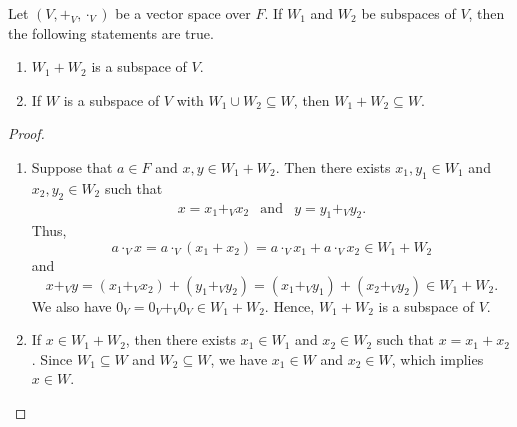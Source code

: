 \begin{theorem}\label{thm:sum}
  Let $(V, +_V, \cdot_V)$ be a vector space over $F$.
  If $W_1$ and $W_2$ be subspaces of $V$, then the following statements are
  true.
  \begin{enumerate}
    \item $W_1 + W_2$ is a subspace of $V$.
    \item If $W$ is a subspace of $V$ with $W_1 \cup W_2 \subseteq W$,
      then $W_1 + W_2 \subseteq W$.
  \end{enumerate}
\end{theorem}
\begin{proof} \leavevmode
  \begin{enumerate}
    \item Suppose that $a \in F$ and $x, y \in W_1 + W_2$.
      Then there exists $x_1, y_1 \in W_1$ and $x_2, y_2 \in W_2$ such that
      \begin{equation*}
        \begin{array}{lll}
        x = x_1 +_V x_2
          & \text{and}
          & y = y_1 +_V y_2.
        \end{array}
      \end{equation*}
      Thus,
      \begin{equation*}
        a \cdot_V x
          = a \cdot_V (x_1 + x_2)
          = a \cdot_V x_1 + a \cdot_V x_2
          \in W_1 + W_2
      \end{equation*}
      and
      \begin{equation*}
        x +_V y
          = (x_1 +_V x_2) + (y_1 +_V y_2)
          = (x_1 +_V y_1) + (x_2 +_V y_2)
          \in W_1 + W_2.
      \end{equation*}
      We also have $0_V = 0_V +_V 0_V \in W_1 + W_2$.
      Hence, $W_1 + W_2$ is a subspace of $V$.
    \item If $x \in W_1 + W_2$, then there exists $x_1 \in W_1$ and
      $x_2 \in W_2$ such that $x = x_1 + x_2$.
      Since $W_1 \subseteq W$ and $W_2 \subseteq W$, we have $x_1 \in W$ and
      $x_2 \in W$, which implies $x \in W$. \qedhere
  \end{enumerate}
\end{proof}